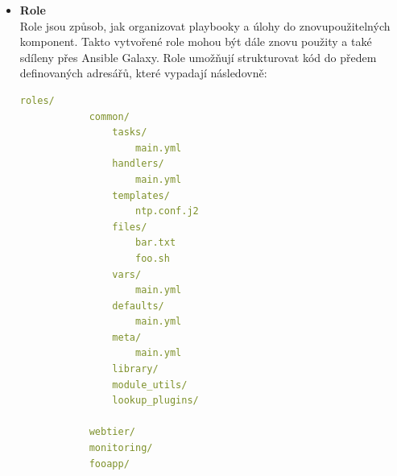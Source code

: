 \begin{itemize}
    \begin{lstlisting}[language=YAML, caption={Ansible - ukázka YAML inventáře}, label={lst:ansibleyamlinventory}, captionpos=b]
    ungrouped:
        hosts:
            mail.example.com:
    webservers:
        hosts:
            foo.example.com:
            bar.example.com:
    dbservers:
        hosts:
            one.example.com:
            two.example.com:
            192.168.1.200:
    \end{lstlisting}

    Ansible definuje vždy 2 hlavní seskupení v inventáři: 
    \begin{itemize}
        \item \texttt{all} - obsahuje všechny zařízení v inventáři
        \item \texttt{ungrouped} - obsahuje zařízení, které nejsou přiřazeny do žádné skupiny
    \end{itemize}
    Všechny ostatní skupiny jsou definovány uživatelem a mohou být hierarchicky organizovány, což umožňuje vytvářet podskupiny a dědit vlastnosti mezi skupinami. \cite{ansibledocs}


    \item \textbf{Role} \\
    Role jsou způsob, jak organizovat playbooky a úlohy do znovupoužitelných komponent.
    Takto vytvořené role mohou být dále znovu použity a také sdíleny přes Ansible Galaxy.
    Role umožňují strukturovat kód do předem definovaných adresářů, které vypadají následovně:
    \begin{lstlisting}[language=YAML, caption={Struktura adresářů pro Ansible role}, label={lst:ansiblerole}, captionpos=b]
        roles/
            common/
                tasks/
                    main.yml
                handlers/
                    main.yml 
                templates/
                    ntp.conf.j2
                files/
                    bar.txt
                    foo.sh
                vars/
                    main.yml
                defaults/
                    main.yml
                meta/
                    main.yml
                library/
                module_utils/
                lookup_plugins/

            webtier/
            monitoring/
            fooapp/
    \end{lstlisting} 
    

\end{itemize}
